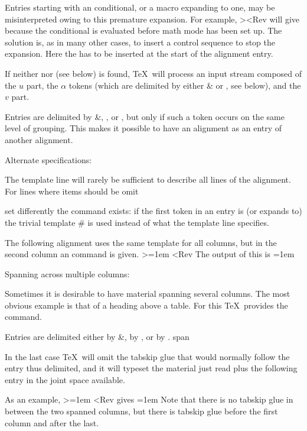 Entries starting with an  conditional, or a macro
expanding to one, may be misinterpreted owing to this
premature expansion. For example,
\Ver><Rev
will give
\disp\leavevmode
     \vbox{}\dispstop
because the conditional is evaluated before math mode has been set up.
The solution is, as in many other cases, to insert a 
 control sequence to stop the expansion.
Here the  has to be inserted at the start of the 
alignment entry.

If neither  nor  (see below) is found,
\TeX\ will process an input stream composed
of  the $u$ part, the $\alpha$ tokens
(which are delimited by either \n\& or , see below),
and the $v$ part.

Entries are delimited by \n\&, , or , but
only if such a token occurs on the same level of grouping.
This makes it possible to have an alignment as an entry of
another alignment.

\spoint Alternate specifications: 

The template line will rarely be sufficient to describe
all lines of the alignment. For lines where items should be
\csterm omit\par
set differently the command  exists:
if the first token in an entry is (or expands to) 
the trivial template \n\# is used instead of
what the template line specifies.

\example The following alignment uses the same template for
all columns, but in the second column an  command
is given.
\Ver>\tabskip=1em
<Rev
The output of this is
\disp\leavevmode\vbox{\tabskip=1em
}
\dispstop
\>

\spoint Spanning across multiple columns: 

Sometimes it is desirable to have material spanning several
columns. The most obvious example is that of a heading above
a table. For this \TeX\ provides the  command.

Entries are delimited either by \n\&, by , or by .
\csterm span\par
In the last case \TeX\ will omit the tabskip glue that
would normally follow the entry thus delimited, and
it will typeset the material just read plus the following
entry in the joint space available.

As an example,
\Ver>\tabskip=1em
<Rev
gives
\disp\leavevmode\vbox{\tabskip=1em
}
\dispstop Note that there is no tabskip glue in between the
two spanned columns, but there is tabskip glue before the
\alt
first column and after the last.

